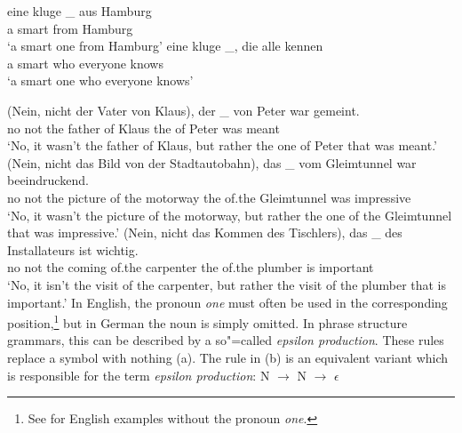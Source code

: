 \ex 
\gll eine kluge \_ aus Hamburg\\
	 a smart {} from Hamburg\\
\glt `a smart one from Hamburg'
\ex 
\gll eine kluge \_, die alle kennen\\
	 a smart {} who everyone knows\\
\glt `a smart one who everyone knows'
\zl

\eal
\label{ex-nounless-np-relational-noun}
\ex 
\gll (Nein, nicht der Vater von Klaus), der \_ von Peter war gemeint.\\
	\spacebr{}no not the father of Klaus the {} of Peter was meant\\
\glt `No, it wasn't the father of Klaus, but rather the one of Peter that was meant.'
\ex 
\gll (Nein, nicht das Bild von der Stadtautobahn), das \_ vom Gleimtunnel war beeindruckend.\\
	 \spacebr{}no not the picture of the motorway the {} of.the Gleimtunnel was impressive\\
\glt `No, it wasn't the picture of the motorway, but rather the one of the Gleimtunnel that was impressive.'
\ex 
\gll (Nein, nicht das Kommen des Tischlers), das \_ des Installateurs ist wichtig.\\
	 \spacebr{}no not the coming of.the carpenter the {} of.the plumber is important\\
\glt `No, it isn't the visit of the carpenter, but rather the visit of the plumber that is important.'
\zl
In English, the pronoun
\emph{one} must often be used in the corresponding position,\footnote{
  See \citet[Section~4.12]{FLGR2012a} for English examples without the
  pronoun \emph{one}.
} but in German the noun is
simply omitted.
In phrase structure grammars, this can be described by a so"=called \emph{epsilon production}.
These rules replace a symbol with nothing (a). The rule in (b) is an equivalent variant which is responsible for the term \emph{epsilon production}:
\eal
\label{np-epsilon}
\ex N $\to$
\ex N $\to$ $\epsilon$
\zl 

